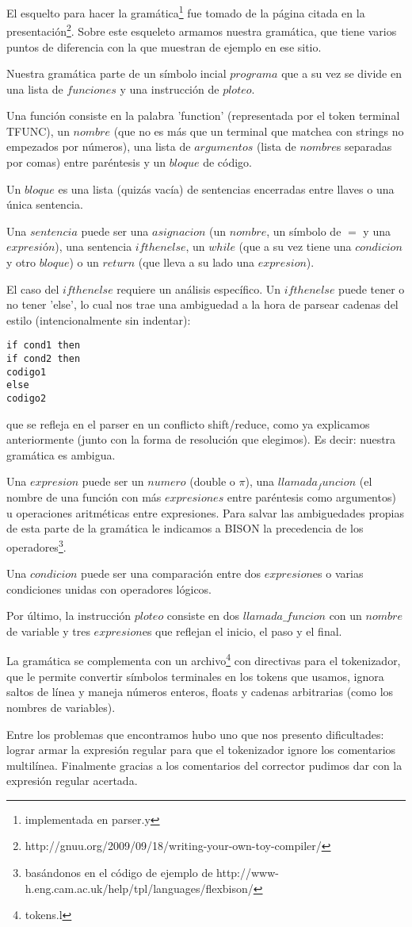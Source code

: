 El esquelto para hacer la gramática\footnote{implementada en parser.y} fue tomado de la página citada en la presentación\footnote{http://gnuu.org/2009/09/18/writing-your-own-toy-compiler/}. Sobre este esqueleto armamos nuestra gramática, que tiene varios puntos de diferencia con la que muestran de ejemplo en ese sitio.

Nuestra gramática parte de un símbolo incial $programa$ que a su vez se divide en una lista de $funciones$ y una instrucción de $ploteo$.

Una función consiste en la palabra 'function' (representada por el token terminal TFUNC), un $nombre$ (que no es más que un terminal que matchea con strings no empezados por números), una lista de $argumentos$ (lista de $nombre$s separadas por comas) entre paréntesis y un $bloque$ de código.

Un $bloque$ es una lista (quizás vacía) de sentencias encerradas entre llaves o una única sentencia.

Una $sentencia$ puede ser una $asignacion$ (un $nombre$, un símbolo de $=$ y una $expresión$), una sentencia $ifthenelse$, un $while$ (que a su vez tiene una $condicion$ y otro $bloque$) o un $return$ (que lleva a su lado una $expresion$).

El caso del $ifthenelse$ requiere un análisis específico. Un $ifthenelse$ puede tener o no tener 'else', lo cual nos trae una ambiguedad a la hora de parsear cadenas del estilo (intencionalmente sin indentar):
\begin{verbatim}
if cond1 then
if cond2 then
codigo1
else
codigo2
\end{verbatim}
que se refleja en el parser en un conflicto shift/reduce, como ya explicamos anteriormente (junto con la forma de resolución que elegimos). Es decir: nuestra gramática es ambigua.

Una $expresion$ puede ser un $numero$ (double o $\pi$), una $llamada_funcion$ (el nombre de una función con más $expresiones$ entre paréntesis como argumentos) u operaciones aritméticas entre expresiones. Para salvar las ambiguedades propias de esta parte de la gramática le indicamos a BISON la precedencia de los operadores\footnote{basándonos en el código de ejemplo de http://www-h.eng.cam.ac.uk/help/tpl/languages/flexbison/}.

Una $condicion$ puede ser una comparación entre dos $expresion$es o varias condiciones unidas con operadores lógicos.

Por último, la instrucción $ploteo$ consiste en dos $llamada\_funcion$ con un $nombre$ de variable y tres $expresion$es que reflejan el inicio, el paso y el final.

La gramática se complementa con un archivo\footnote{tokens.l} con directivas para el tokenizador, que le permite convertir símbolos terminales en los tokens que usamos, ignora saltos de línea y maneja números enteros, floats y cadenas arbitrarias (como los nombres de variables).

Entre los problemas que encontramos hubo uno que nos presento dificultades: lograr armar la expresión regular para que el tokenizador ignore los comentarios multilínea. Finalmente gracias a los comentarios del corrector pudimos dar con la expresión regular acertada.